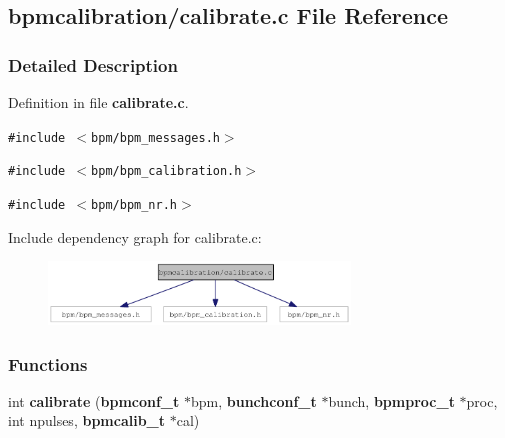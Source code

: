 \subsection{bpmcalibration/calibrate.c File Reference}
\label{calibrate_8c}


\subsubsection{Detailed Description}


Definition in file {\bf calibrate.c}.

{\tt \#include $<$bpm/bpm\_\-messages.h$>$}\par
{\tt \#include $<$bpm/bpm\_\-calibration.h$>$}\par
{\tt \#include $<$bpm/bpm\_\-nr.h$>$}\par


Include dependency graph for calibrate.c:\nopagebreak
\begin{figure}[H]
\begin{center}
\leavevmode
\includegraphics[width=227pt]{calibrate_8c__incl}
\end{center}
\end{figure}
\subsubsection*{Functions}
\begin{CompactItemize}
\item 
int {\bf calibrate} ({\bf bpmconf\_\-t} $\ast$bpm, {\bf bunchconf\_\-t} $\ast$bunch, {\bf bpmproc\_\-t} $\ast$proc, int npulses, {\bf bpmcalib\_\-t} $\ast$cal)
\end{CompactItemize}
